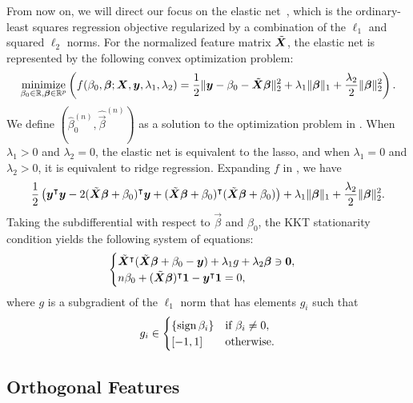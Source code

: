From now on, we will direct our focus on the elastic net~\citep{zou2005}, which is the ordinary-least squares regression objective regularized by a combination of the \(\ell_1\) and squared \(\ell_2\) norms. For the normalized feature matrix \(\tilde{\boldsymbol{X}}\), the elastic net is represented by the following convex optimization problem:
\begin{equation}
  \label{eq:elastic-net}
  \operatorname*{minimize}_{\beta_0 \in \mathbb{R},\boldsymbol{\beta} \in \mathbb{R}^p}\left( f(\beta_0, \boldsymbol{\beta};\boldsymbol{X},\boldsymbol{y},\lambda_1,\lambda_2)=\frac{1}{2} \lVert \boldsymbol y - \beta_0 - \tilde{\boldsymbol{X}}\boldsymbol{\beta} \rVert^2_2  + \lambda_1 \lVert \boldsymbol\beta \rVert_1 + \frac{\lambda_2}{2}\lVert \boldsymbol \beta \rVert_2^2\right).
\end{equation}
We define \((\hat{\beta}_0^{(n)}, \hat{\vec{\beta}}^{(n)})\) as a solution to the optimization problem in .
When \(\lambda_1 > 0\) and \(\lambda_2 = 0\), the elastic net is equivalent to the lasso, and when \(\lambda_1 = 0\) and \(\lambda_2 > 0\), it is equivalent to ridge regression. Expanding \(f\) in , we have
\[
  \begin{aligned}
    \frac{1}{2}\left( \boldsymbol y^\intercal \boldsymbol y - 2(\tilde{\boldsymbol{X}}\boldsymbol{\beta} + \beta_0)^\intercal\boldsymbol{y} + (\tilde{\boldsymbol{X}}\boldsymbol{\beta} + \beta_0)^\intercal(\tilde{\boldsymbol{X}}\boldsymbol{\beta} + \beta_0)\right) + \lambda_1 \lVert \boldsymbol\beta \rVert_1 + \frac{\lambda_2}{2}\lVert \boldsymbol \beta \rVert_2^2.
  \end{aligned}
\]
Taking the subdifferential with respect to \(\vec{\beta}\) and \(\beta_0\), the KKT stationarity condition yields the following system of equations:
\begin{equation}
  \label{eq:kkt-elasticnet}
  \begin{cases}
    \tilde{\boldsymbol{X}}^\intercal(\tilde{\boldsymbol{X}}\boldsymbol{\beta} + \beta_0 - \boldsymbol{y}) + \lambda_1 g + \lambda_2 \boldsymbol\beta \ni \boldsymbol{0}, \\
    n \beta_0 + (\tilde{\boldsymbol{X}}\boldsymbol{\beta})^\intercal \boldsymbol{1} - \boldsymbol{y}^\intercal \boldsymbol{1} = 0,
  \end{cases}
\end{equation}
where \(g\) is a subgradient of the \(\ell_1\) norm that has elements \(g_i\) such that
\[
  g_i \in
  \begin{cases}
    \{\operatorname{sign}{\beta_i}\} & \text{if } \beta_i \neq 0, \\
    [-1, 1]            & \text{otherwise}.
  \end{cases}
\]

\subsection{Orthogonal Features}

